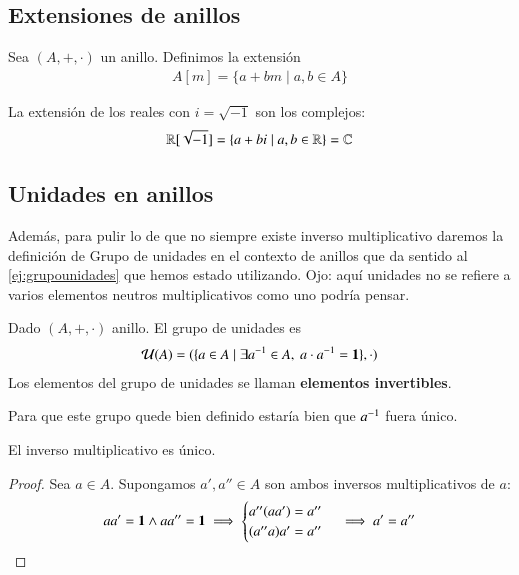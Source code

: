 \subsection{Extensiones de anillos}
\begin{dfn}
	Sea $(A, +, \cdot)$ un anillo. Definimos la extensión
	\begin{align}
		A[m] = \{a+bm \mid a, b \in A\}
	\end{align}
\end{dfn}

\begin{ej}La extensión de los reales con $i = \sqrt{-1}$ son los complejos:
	\begin{align*}
		\mathbb{R}[\sqrt{-1}] = \{a+bi \mid a,b \in \mathbb{R}\} = \mathbb{C}
	\end{align*}
\end{ej}

\subsection{Unidades en anillos}

Además, para pulir lo de que no siempre existe inverso multiplicativo daremos la definición de Grupo de unidades en el contexto de anillos que da sentido al \autoref{ej:grupounidades} que hemos estado utilizando. Ojo: aquí unidades no se refiere a varios elementos neutros multiplicativos como uno podría pensar.

\begin{dfn}
	Dado $(A, +, \cdot)$ anillo. El grupo de unidades es
	\begin{align}
		\mathcal{U}(A) = (\{a \in A \mid \exists a^{-1} \in A,\ a\cdot a^{-1} = \mathbf{1}\}, \cdot)
	\end{align}
	Los elementos del grupo de unidades se llaman \textbf{elementos invertibles}.
\end{dfn}

Para que este grupo quede bien definido estaría bien que $a^{-1}$ fuera único.

\begin{pro}
	El inverso multiplicativo es único.
\end{pro}

\begin{proof}
	Sea $a \in A$. Supongamos $a', a'' \in A$ son ambos inversos multiplicativos de $a$:
	\begin{align*}
		aa' = \mathbf{1} \land aa'' = \mathbf{1}\implies \begin{cases}
		a''(aa') = a'' \\
		(a''a)a' = a''
		\end{cases}\implies a' = a''
	\end{align*}
\end{proof}

